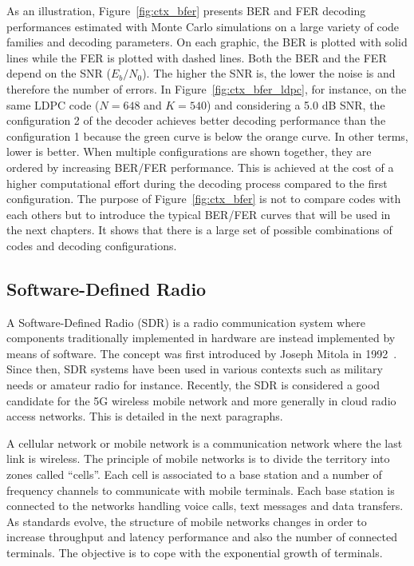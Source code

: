 As an illustration, Figure~\ref{fig:ctx_bfer} presents BER and FER decoding
performances estimated with Monte Carlo simulations on a large variety of code
families and decoding parameters. On each graphic, the BER is plotted with solid
lines while the FER is plotted with dashed lines. Both the BER and the FER
depend on the SNR ($E_b/N_0$). The higher the SNR is, the lower the noise is and
therefore the number of errors. In Figure~\ref{fig:ctx_bfer_ldpc}, for instance,
on the same LDPC code ($N = 648$ and $K = 540$) and considering a 5.0 dB SNR,
the configuration 2 of the decoder achieves better decoding performance than the
configuration 1 because the {\color{Paired-3} green} curve is below the
{\color{Paired-7} orange} curve. In other terms, lower is better. When multiple
configurations are shown together, they are ordered by increasing BER/FER
performance. This is achieved at the cost of a higher computational effort
during the decoding process compared to the first configuration. The purpose of
Figure~\ref{fig:ctx_bfer} is not to compare codes with each others but to
introduce the typical BER/FER curves that will be used in the next chapters. It
shows that there is a large set of possible combinations of codes and decoding
configurations.

\newpage
\subsection{Software-Defined Radio}

A Software-Defined Radio (SDR) is a radio communication system where components
traditionally implemented in hardware are instead implemented by means of
software. The concept was first introduced by Joseph Mitola in
1992~\cite{Mitola1992,Mitola1993}. Since then, SDR systems have been used in
various contexts such as military needs or amateur radio for instance. Recently,
the SDR is considered a good candidate for the 5G wireless mobile network and
more generally in cloud radio access networks. This is detailed in the next
paragraphs.

A cellular network or mobile network is a communication network where the last
link is wireless. The principle of mobile networks is to divide the territory
into zones called ``cells''. Each cell is associated to a base station and a
number of frequency channels to communicate with mobile terminals. Each base
station is connected to the networks handling voice calls, text messages and
data transfers. As standards evolve, the structure of mobile networks changes in
order to increase throughput and latency performance and also the number of
connected terminals. The objective is to cope with the exponential growth of
terminals.


